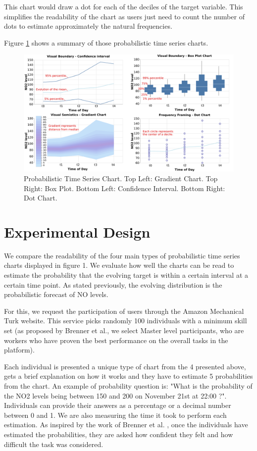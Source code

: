 \documentclass[a4paper,3p,sort&compress]{elsarticle}
\begin{document}
This chart would draw a dot for each of the deciles of the target variable. This simplifies the 
readability of the chart as users just need to count the number of dots to estimate approximately 
the natural frequencies.

Figure \ref{figure:charts} shows a summary of those probabilistic time series charts.

\begin{figure}
  \centering
  \includegraphics[width=.8\textwidth]{charts} 
  \caption{\label{figure:charts} Probabilistic Time Series Chart. 
  Top Left: Gradient Chart. Top Right: Box Plot. 
  Bottom Left: Confidence Interval. Bottom Right: Dot Chart.  }
\end{figure}

\section{Experimental Design}
\label{sec:exp_design}

We compare the readability of the four main types of probabilistic time series charts 
displayed in figure 1. We evaluate how well the charts can be read to estimate the probability 
that the evolving target is within a certain interval at a certain time point. As stated previously, 
the evolving distribution is the probabilistic forecast of NO levels. 

For this, we request the participation of users through the Amazon Mechanical Turk website. 
This service picks randomly 100 individuals with a minimum skill set (as proposed by Brenner 
et al., we select Master level participants, who are workers who have proven the best performance 
on the overall tasks in the platform).

Each individual is presented a unique type of chart from the 4 presented above, gets a brief 
explanation on how it works and they have to estimate 5 probabilities from the chart. An example of
probability question is: "What is the probability of the NO2 levels being between 150 and 200 on 
November 21st at 22:00 ?". Individuals can provide their answers as a percentage or a 
decimal number between 0
and 1. We are also measuring the time it took to perform each estimation. 
As inspired by the work of Brenner et 
al. , once the individuals have estimated the probabilities, they are asked how confident they 
felt and how difficult the task was considered.
\end{document}
